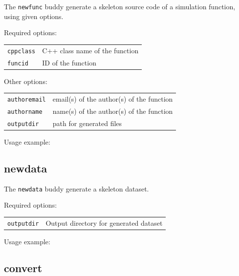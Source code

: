 The \texttt{newfunc} buddy generate a skeleton source code of a simulation function, using given options. 

\bigskip

\noindent Required options:
\begin{center}
\begin{tabularx}{\linewidth}{lX}
\texttt{cppclass}&C++ class name of the function\\
\texttt{funcid}&ID of the function\\
\end{tabularx}
\end{center}
    
\noindent Other options:
\begin{center}
\begin{tabularx}{\linewidth}{lX}
\texttt{authoremail}&email(s) of the author(s) of the function\\
\texttt{authorname}&name(s) of the author(s) of the function\\
\texttt{outputdir}&path for generated files\\
\end{tabularx}
\end{center}

\bigskip

\noindent Usage example:\\


\subsection{newdata}

The \texttt{newdata} buddy generate a skeleton dataset. 

\bigskip

\noindent Required options:
\begin{center}
\begin{tabularx}{\linewidth}{lX}
\texttt{outputdir}&Output directory for generated dataset\\
\end{tabularx}
\end{center}

\bigskip

\noindent Usage example:\\

\subsection{convert}

